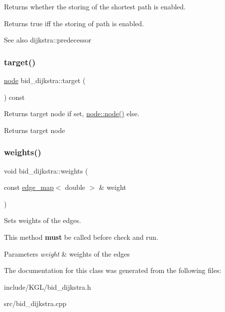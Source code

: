 Returns whether the storing of the shortest path is enabled. 

\begin{DoxyReturn}{Returns}
{\ttfamily true} iff the storing of path is enabled.
\end{DoxyReturn}
\begin{DoxySeeAlso}{See also}
dijkstra\+::predecessor 
\end{DoxySeeAlso}
\mbox{\label{classbid__dijkstra_a5d32d74a93c1be5581f56ba3a2839ff5}} 
\subsubsection{\texorpdfstring{target()}{target()}}
{\footnotesize\ttfamily \mbox{\hyperlink{classnode}{node}} bid\+\_\+dijkstra\+::target (\begin{DoxyParamCaption}{ }\end{DoxyParamCaption}) const}



Returns target node if set, {\ttfamily \mbox{\hyperlink{classnode_ad603259398d5667e3b97a6322a2bcc20}{node\+::node()}}} else. 

\begin{DoxyReturn}{Returns}
target node 
\end{DoxyReturn}
\mbox{\label{classbid__dijkstra_a33dd3a1cc5eb156b56a72235c9140e7d}} 
\subsubsection{\texorpdfstring{weights()}{weights()}}
{\footnotesize\ttfamily void bid\+\_\+dijkstra\+::weights (\begin{DoxyParamCaption}\item[{const \mbox{\hyperlink{classedge__map}{edge\+\_\+map}}$<$ double $>$ \&}]{weight }\end{DoxyParamCaption})}



Sets weights of the edges. 

This method {\bfseries must} be called before check and run.


\begin{DoxyParams}{Parameters}
{\em weight} & weights of the edges \\
\hline
\end{DoxyParams}


The documentation for this class was generated from the following files\+:\begin{DoxyCompactItemize}
\item 
include/\+K\+G\+L/bid\+\_\+dijkstra.\+h\item 
src/bid\+\_\+dijkstra.\+cpp\end{DoxyCompactItemize}
